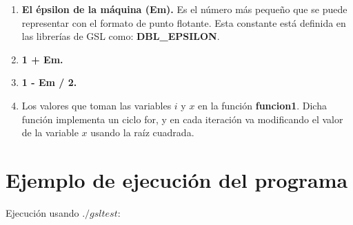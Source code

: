 \documentclass[12pt]{article}
\begin{document}
\begin{enumerate}
	\item \textbf{El épsilon de la máquina (Em).} Es el número más pequeño que se puede representar con el formato de punto flotante. Esta constante está definida en las librerías de GSL como: \textbf{DBL\_EPSILON}.
	\item \textbf{1 + Em.}
	\item \textbf{1 - Em / 2.}
	\item Los valores que toman las variables $i$ y $x$ en la función \textbf{funcion1}. Dicha función implementa un ciclo for, y en cada iteración va modificando el valor de la variable $x$ usando la raíz cuadrada.
\end{enumerate}

\section{Ejemplo de ejecución del programa}
Ejecución usando $./gsltest$:\\
\end{document}
